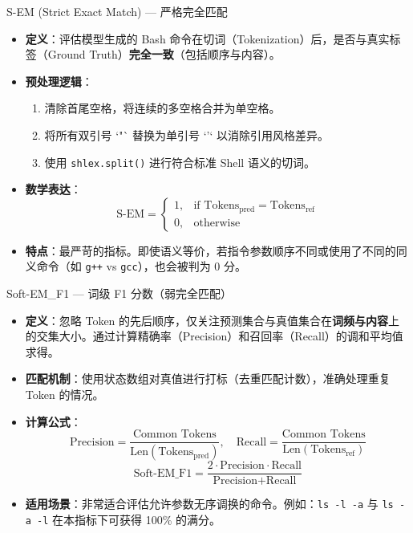 \documentclass[aspectratio=169]{beamer}
\begin{document}
\begin{frame}{S-EM (Strict Exact Match) — 严格完全匹配}
    \begin{itemize}
        \item \textbf{定义}：评估模型生成的 Bash 命令在切词（Tokenization）后，是否与真实标签（Ground Truth）\textbf{完全一致}（包括顺序与内容）。
        \item \textbf{预处理逻辑}：
        \begin{enumerate}
            \item 清除首尾空格，将连续的多空格合并为单空格。
            \item 将所有双引号 `"` 替换为单引号 `'` 以消除引用风格差异。
            \item 使用 \texttt{shlex.split()} 进行符合标准 Shell 语义的切词。
        \end{enumerate}
        \item \textbf{数学表达}：
        $$\text{S-EM} = \begin{cases} 
        1, & \text{if } \text{Tokens}_{\text{pred}} = \text{Tokens}_{\text{ref}} \\ 
        0, & \text{otherwise} 
        \end{cases}$$
        \item \textbf{特点}：最严苛的指标。即使语义等价，若指令参数顺序不同或使用了不同的同义命令（如 \texttt{g++} vs \texttt{gcc}），也会被判为 0 分。
    \end{itemize}
\end{frame}

\begin{frame}{Soft-EM\_F1 — 词级 F1 分数（弱完全匹配）}
    \begin{itemize}
        \item \textbf{定义}：忽略 Token 的先后顺序，仅关注预测集合与真值集合在\textbf{词频与内容}上的交集大小。通过计算精确率（Precision）和召回率（Recall）的调和平均值求得。
        \item \textbf{匹配机制}：使用状态数组对真值进行打标（去重匹配计数），准确处理重复 Token 的情况。
        \item \textbf{计算公式}：
        $$\text{Precision} = \frac{\text{Common Tokens}}{\text{Len}(\text{Tokens}_{\text{pred}})}, \quad \text{Recall} = \frac{\text{Common Tokens}}{\text{Len}(\text{Tokens}_{\text{ref}})}$$
        $$\text{Soft-EM\_F1} = \frac{2 \cdot \text{Precision} \cdot \text{Recall}}{\text{Precision} + \text{Recall}}$$
        \item \textbf{适用场景}：非常适合评估允许参数无序调换的命令。例如：\texttt{ls -l -a} 与 \texttt{ls -a -l} 在本指标下可获得 100\% 的满分。
    \end{itemize}
\end{frame}
\end{document}
